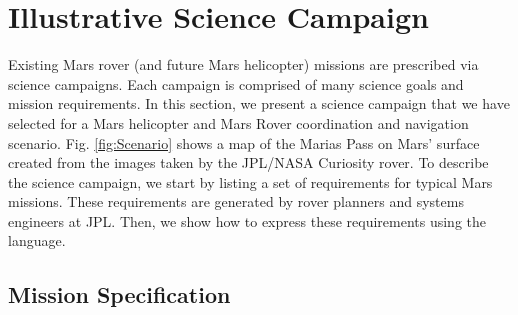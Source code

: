 \documentclass[letterpaper]{article} %
\begin{document}
	
	\section{Illustrative Science Campaign}
		\label{sec:misspec}
	Existing Mars rover (and future Mars helicopter) missions are prescribed via science campaigns. Each campaign is comprised of many science goals and mission requirements. In this section, we present a science campaign that we have selected for a Mars helicopter and Mars Rover coordination and navigation scenario. Fig. \ref{fig:Scenario} shows a map of the Marias Pass on Mars' surface created from the images taken by the JPL/NASA Curiosity rover. To describe the science campaign, we start by listing a set of requirements for typical Mars missions. These requirements are generated by rover planners and systems engineers at JPL. Then, we show how to express these requirements using the \DTL language.
    
	\subsection{Mission Specification}
\end{document}
